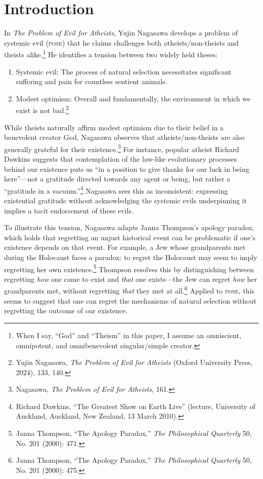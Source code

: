 \vspace{\credgap}

\section*{Introduction}

In \emph{The Problem of Evil for Atheists,} Yujin Nagasawa develops a
problem of systemic evil (\textsc{pose}) that he claims challenges both
atheists/non-theists and theists alike.\footnote{When I say, ``God'' and
  ``Theism'' in this paper, I assume an omniscient, omnipotent, and
  omnibenevolent singular/simple creator.} He identifies a tension
between two widely held theses: 

\begin{enumerate}[leftmargin=42pt]
\def\labelenumi{(\arabic{enumi})}
\item
  Systemic evil: The process of natural selection necessitates
  significant suffering and pain for countless sentient animals.
\item
  Modest optimism: Overall and fundamentally, the environment in which
  we exist is not bad.\footnote{Yujin Nagasawa, \emph{The Problem of
    Evil for Atheists} (Oxford University Press, 2024), 133, 140.}
\end{enumerate}

\noindent While theists naturally affirm modest optimism due to their belief in a
benevolent creator God, Nagasawa observes that atheists/non-theists are
also generally grateful for their existence.\footnote{Nagasawa,
  \emph{The Problem of Evil for Atheists}, 161.} For instance, popular
atheist Richard Dawkins suggests that contemplation of the law-like
evolutionary processes behind our existence puts us ``in a position to
give thanks for our luck in being here''---not a gratitude directed
towards any agent or being, but rather a ``gratitude in a
vacuum.''\footnote{Richard Dawkins, ``The Greatest Show on Earth
  Live'' (lecture, University of Auckland, Auckland, New Zealand, 13
  March 2010).} Nagasawa sees this as inconsistent: expressing
existential gratitude without acknowledging the systemic evils
underpinning it implies a tacit endorsement of these evils.

To illustrate this tension, Nagasawa adapts Janna Thompson's apology
paradox, which holds that regretting an unjust historical event can be
problematic if one's existence depends on that event. For example, a Jew
whose grandparents met during the Holocaust faces a paradox: to regret
the Holocaust may seem to imply regretting her own existence.\footnote{Janna
  Thompson, ``The Apology Paradox,'' \emph{The Philosophical Quarterly}
  50\emph{,} No. 201 (2000): 471.} Thompson resolves this by
distinguishing between regretting \emph{how} one came to exist and
\emph{that} one exists---the Jew can regret \emph{how} her grandparents
met, without regretting \emph{that} they met at all.\footnote{Janna
  Thompson, ``The Apology Paradox,'' \emph{The Philosophical Quarterly}
  50\emph{,} No. 201 (2000): 475.} Applied to \textsc{pose}, this seems to suggest that one can regret the
mechanisms of natural selection without regretting the outcome of our
existence.

